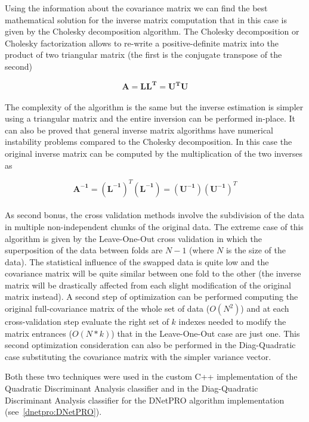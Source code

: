 \documentclass{standalone}
\begin{document}
Using the information about the covariance matrix we can find the best mathematical solution for the inverse matrix computation that in this case is given by the Cholesky decomposition algorithm.
The Cholesky decomposition or Cholesky factorization allows to re-write a positive-definite matrix into the product of two triangular matrix (the first is the conjugate transpose of the second)

$$
\mathbf{A} = \mathbf{LL^T} = \mathbf{U^TU}
$$
\\
The complexity of the algorithm is the same but the inverse estimation is simpler using a triangular matrix and the entire inversion can be performed in-place.
It can also be proved that general inverse matrix algorithms have numerical instability problems compared to the Cholesky decomposition.
In this case the original inverse matrix can be computed by the multiplication of the two inverses as

$$
\mathbf{A^{-1}} = (\mathbf{L^{-1}})^T(\mathbf{L^{-1}}) = (\mathbf{U^{-1}})(\mathbf{U^{-1}})^T
$$
\\
As second bonus, the cross validation methods involve the subdivision of the data in multiple non-independent chunks of the original data.
The extreme case of this algorithm is given by the Leave-One-Out cross validation in which the superposition of the data between folds are $N-1$ (where $N$ is the size of the data).
The statistical influence of the swapped data is quite low and the covariance matrix will be quite similar between one fold to the other (the inverse matrix will be drastically affected from each slight modification of the original matrix instead).
A second step of optimization can be performed computing the original full-covariance matrix of the whole set of data ($O(N^2)$) and at each cross-validation step evaluate the right set of $k$ indexes needed to modify the matrix entrances ($O(N*k)$) that in the Leave-One-Out case are just one.
This second optimization consideration can also be performed in the Diag-Quadratic case substituting the covariance matrix with the simpler variance vector.


Both these two techniques were used in the custom \textsf{C++} implementation of the Quadratic Discriminant Analysis classifier and in the Diag-Quadratic Discriminant Analysis classifier for the DNetPRO algorithm implementation (see~\ref{dnetpro:DNetPRO}).
\end{document}
